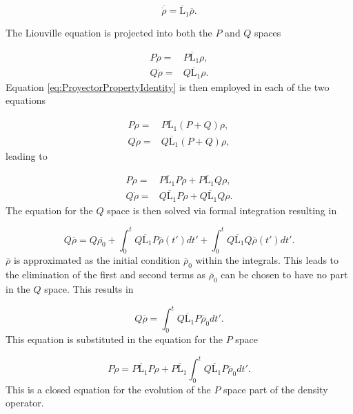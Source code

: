 \documentclass[12pt]{article}
\begin{document}
\begin{equation}
    \overline{\dot{\rho}} = \overline{\mathrm{L}}_1 \overline{\rho}. 
\end{equation}

The Liouville equation is projected into both the $P$ and $Q$ spaces

\begin{align}
    P\dot{\rho} =& P\overline{\mathrm{L}}_1\rho,\\
    Q\dot{\rho} =& Q\overline{\mathrm{L}}_1\rho.
\end{align} Equation \eqref{eq:ProyectorPropertyIdentity} is then employed in each of the two equations

\begin{align}
    P\dot{\rho} =& P\overline{\mathrm{L}}_1(P+Q)\rho,\\
    Q\dot{\rho} =& Q\overline{\mathrm{L}}_1(P+Q)\rho,  
\end{align} leading to

\begin{align}
    P\dot{\rho} =& P\overline{\mathrm{L}}_1P\rho+P\overline{\mathrm{L}}_1Q\rho,\\
    Q\dot{\rho} =& Q\overline{\mathrm{L}}_1P\rho+Q\overline{\mathrm{L}}_1Q\rho.
\end{align} The equation for the $Q$ space is then solved via formal integration resulting in

\begin{equation}
    Q\overline{\rho} = Q\overline{\rho_0} + \int_0^t Q\overline{\mathrm{L}}_1P\overline{\rho}(t') dt'+\int_0^t Q\overline{\mathrm{L}}_1Q\overline{\rho}(t') dt'.
\end{equation}  $\overline{\rho}$ is approximated as the initial condition $\overline{\rho}_0$ within the integrals. This leads to the elimination of the first and second terms as $\overline{\rho}_0$ can be chosen to have no part in the $Q$ space. This results in

\begin{equation}
    Q\overline{\rho} = \int_0^t Q\overline{\mathrm{L}}_1P\overline{\rho}_0 dt'.
\end{equation} This equation is substituted in the equation for the $P$ space

\begin{equation}
   P\dot{\rho} = P\overline{\mathrm{L}}_1P\rho+P\overline{\mathrm{L}}_1\int_0^t Q\overline{\mathrm{L}}_1 P\overline{\rho}_0 dt'.  
\end{equation} This is a closed equation for the evolution of the $P$ space part of the density operator.
\end{document}

